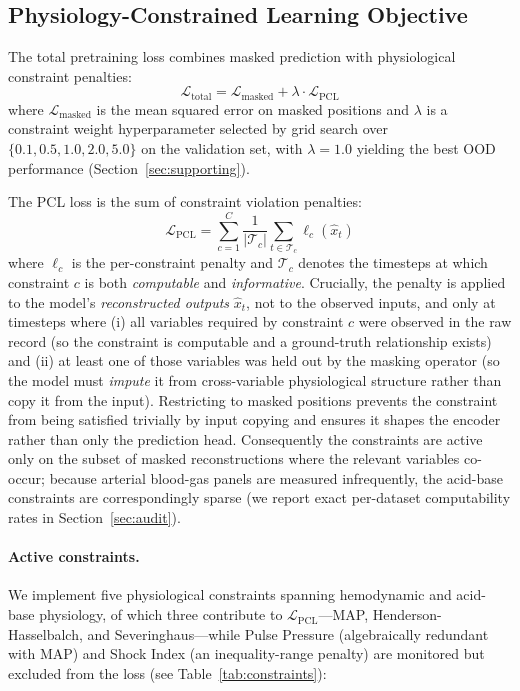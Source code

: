 \documentclass{article}
\begin{document}
\subsection{Physiology-Constrained Learning Objective}

The total pretraining loss combines masked prediction with physiological constraint penalties:
\begin{equation}
\label{eq:total_loss}
\mathcal{L}_{\text{total}} = \mathcal{L}_{\text{masked}} + \lambda \cdot \mathcal{L}_{\text{PCL}}
\end{equation}
where $\mathcal{L}_{\text{masked}}$ is the mean squared error on masked positions and $\lambda$ is a constraint weight hyperparameter selected by grid search over $\{0.1, 0.5, 1.0, 2.0, 5.0\}$ on the validation set, with $\lambda = 1.0$ yielding the best OOD performance (Section~\ref{sec:supporting}).

The PCL loss is the sum of constraint violation penalties:
\begin{equation}
\mathcal{L}_{\text{PCL}} = \sum_{c=1}^{C} \frac{1}{|\mathcal{T}_c|} \sum_{t \in \mathcal{T}_c} \ell_c(\hat{x}_t)
\end{equation}
where $\ell_c$ is the per-constraint penalty and $\mathcal{T}_c$ denotes the timesteps at which constraint $c$ is both \emph{computable} and \emph{informative}.
Crucially, the penalty is applied to the model's \emph{reconstructed outputs} $\hat{x}_t$, not to the observed inputs, and only at timesteps where (i) all variables required by constraint $c$ were observed in the raw record (so the constraint is computable and a ground-truth relationship exists) and (ii) at least one of those variables was held out by the masking operator (so the model must \emph{impute} it from cross-variable physiological structure rather than copy it from the input). Restricting to masked positions prevents the constraint from being satisfied trivially by input copying and ensures it shapes the encoder rather than only the prediction head. Consequently the constraints are active only on the subset of masked reconstructions where the relevant variables co-occur; because arterial blood-gas panels are measured infrequently, the acid-base constraints are correspondingly sparse (we report exact per-dataset computability rates in Section~\ref{sec:audit}).

\paragraph{Active constraints.}
We implement five physiological constraints spanning hemodynamic and acid-base physiology, of which three contribute to $\mathcal{L}_{\text{PCL}}$---MAP, Henderson-Hasselbalch, and Severinghaus---while Pulse Pressure (algebraically redundant with MAP) and Shock Index (an inequality-range penalty) are monitored but excluded from the loss (see Table~\ref{tab:constraints}):
\end{document}

